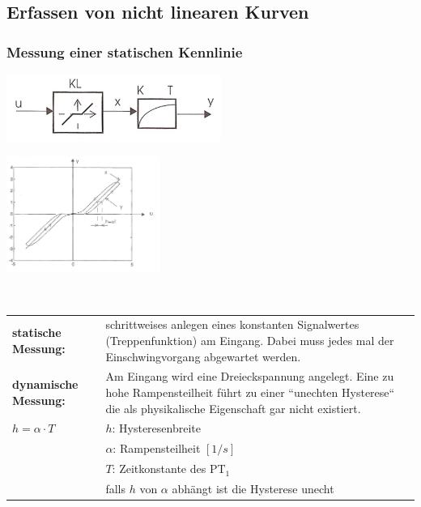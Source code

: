 	\subsection{Erfassen von nicht linearen Kurven}
	\subsubsection{Messung einer statischen Kennlinie}
	\begin{minipage}{10cm}
		\includegraphics[width=7cm]{./bilder/NichtlinearMitPT1.jpg}   
    \end{minipage}
	\begin{minipage}{7cm}
    	\includegraphics[width=5cm]{./bilder/NichtlinearMitPT1_dia.jpg}
    \end{minipage}\\
		
		\begin{tabular}{p{4cm}  p{12cm}}
				\textbf{statische Messung:} &
				schrittweises anlegen eines konstanten Signalwertes (Treppenfunktion)
				am Eingang. Dabei muss jedes mal der Einschwingvorgang abgewartet werden.\\
				
				\textbf{dynamische Messung:} &
				Am Eingang wird eine Dreieckspannung angelegt. Eine zu hohe Rampensteilheit
				führt zu einer ``unechten Hysterese`` die als physikalische Eigenschaft gar
				nicht existiert.\\
		
				$h = \alpha \cdot T$ & $h$: Hysteresenbreite\\
				& $\alpha$: Rampensteilheit $[1/s]$\\
				& $T$: Zeitkonstante des PT$_1$\\
				& falls $h$ von $\alpha$ abhängt ist die Hysterese unecht
			
		\end{tabular}
	
